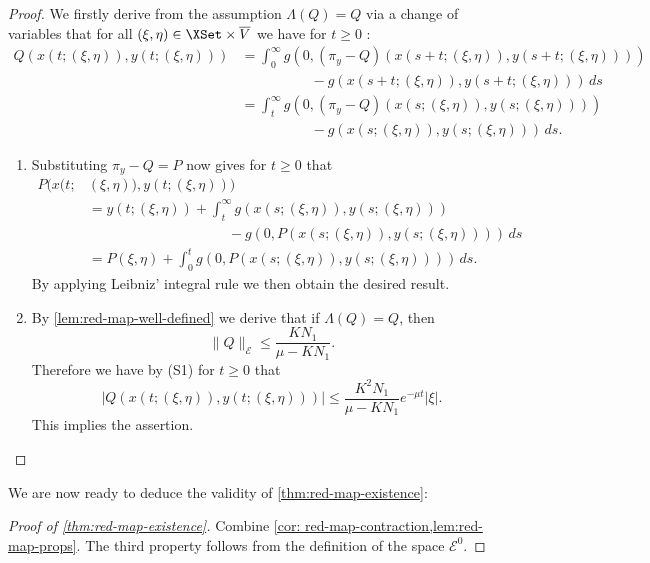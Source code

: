 \documentclass[a4paper]{siamart190516}
\begin{document}
\begin{proof}
We firstly derive from the assumption $\Lambda(Q) = Q$ via a change of variables that for all $(\xi,\eta) \in \XSet \times \overline{V}$ we have for $t \geq 0$ :
\begin{align*}
Q(x(t; (\xi,\eta)),y(t;(\xi,\eta))) &= \int_0^{\infty} g(0, (\pi_y-Q)(x(s+t; (\xi,\eta)),y(s+t;(\xi,\eta))) ) \\
& \qquad \qquad \quad  - g(x(s+t; (\xi,\eta)),y(s+t;(\xi,\eta)))    \, ds \\
&=  \int_t^{\infty} g(0, (\pi_y-Q)(x(s; (\xi,\eta)),y(s;(\xi,\eta))) ) \\
& \qquad \qquad \quad  - g(x(s; (\xi,\eta)),y(s;(\xi,\eta)))    \, ds.
\end{align*}
\begin{enumerate}
\item Substituting $\pi_y-Q=P$ now gives for $t \geq 0$ that
\begin{align*}
P(x(t; &(\xi,\eta)),y(t;(\xi,\eta))) \\
&= y(t;(\xi,\eta)) + \int_t^{\infty} g(x(s; (\xi,\eta)),y(s;(\xi,\eta))) \\
&\qquad \qquad \qquad \qquad \qquad - g(0, P(x(s; (\xi,\eta)),y(s;(\xi,\eta))) )   \, ds \\
&=  P(\xi,\eta) + \int_0^t  g(0, P(x(s; (\xi,\eta)),y(s;(\xi,\eta))) ) \, ds.
\end{align*}
By applying Leibniz' integral rule we then obtain the desired result.
\item By \cref{lem:red-map-well-defined} we derive that if $\Lambda(Q) = Q$, then
 \[
\| Q \|_{\mathcal{E}} \leq \frac{K N_1}{\mu - K N_1}.
\]
Therefore we have by (S1) for $t \geq 0$ that
\[
| Q(x(t; (\xi,\eta)),y(t;(\xi,\eta))) | \leq \frac{K^2 N_1}{\mu - K N_1} e^{-\mu t}  |\xi|.
\]
This implies the assertion.
\end{enumerate}
\end{proof}

We are now ready to deduce the validity of \cref{thm:red-map-existence}:

\begin{proof}[Proof of \cref{thm:red-map-existence}]
  Combine \cref{cor: red-map-contraction,lem:red-map-props}.
  The third property follows from the definition of the space $\mathcal{E}^0$.
\end{proof}





\end{document}
